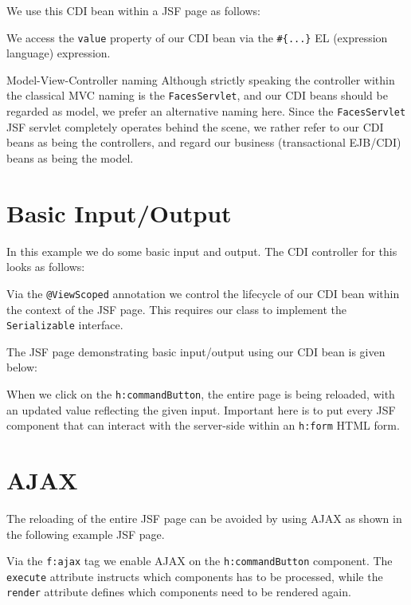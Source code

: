 We use this CDI bean within a JSF page as follows:

We access the \texttt{value} property of our CDI bean via the \texttt{\#\{...\}} EL (expression language) expression.

\begin{TIP}{Model-View-Controller naming}
	Although strictly speaking the controller within the classical MVC naming is the \texttt{FacesServlet}, and our CDI beans should be regarded as model,
	we prefer an alternative naming here.
	Since the \texttt{FacesServlet} JSF servlet completely operates behind the scene, we rather refer to our CDI beans as being the controllers,
	and regard our business (transactional EJB/CDI) beans as being the model.
\end{TIP}

\section{Basic Input/Output}
\label{sec:basic-input-output}

In this example we do some basic input and output.
The CDI controller for this looks as follows:

Via the \texttt{@ViewScoped} annotation we control the lifecycle of our CDI bean within the context of the JSF page.
This requires our class to implement the \texttt{Serializable} interface.

The JSF page demonstrating basic input/output using our CDI bean is given below:

When we click on the \texttt{h:commandButton}, the entire page is being reloaded, with an updated value reflecting the given input.
Important here is to put every JSF component that can interact with the server-side within an \texttt{h:form} HTML form.


\section{AJAX}

The reloading of the entire JSF page can be avoided by using AJAX as shown in the following example JSF page.

Via the \texttt{f:ajax} tag we enable AJAX on the \texttt{h:commandButton} component.
The \texttt{execute} attribute instructs which components has to be processed, while the \texttt{render} attribute defines which components need to be rendered again.


